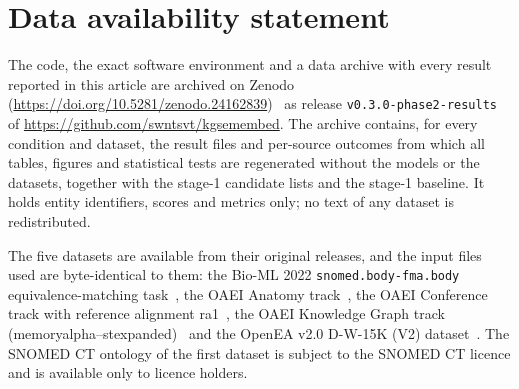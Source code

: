 \section*{Data availability statement}

The code, the exact software environment and a data archive with every
result reported in this article are archived on Zenodo
(\url{https://doi.org/10.5281/zenodo.24162839})~\cite{kgsemembed2026zenodo}
as release \texttt{v0.3.0-phase2-results} of
\url{https://github.com/swntsvt/kgsemembed}. The archive contains, for every
condition and dataset, the result files and per-source outcomes from which
all tables, figures and statistical tests are regenerated without the models
or the datasets, together with the stage-1 candidate lists and the stage-1
baseline. It holds entity identifiers, scores and metrics only; no text of
any dataset is redistributed.

The five datasets are available from their original releases, and the
input files used are byte-identical to them: the Bio-ML 2022
\texttt{snomed.body-fma.body} equivalence-matching task~\cite{he2022bioml},
the OAEI Anatomy track~\cite{bodenreider2005mice,oaei2024anatomy}, the OAEI
Conference track with reference alignment ra1~\cite{zamazal2017ontofarm,oaei2024conference},
the OAEI Knowledge Graph track (memoryalpha--stexpanded)~\cite{hertling2020kgtrack,oaei2023kg}
and the OpenEA v2.0 D-W-15K (V2) dataset~\cite{sun2020openea,openea2020dataset}.
The SNOMED CT ontology of the first dataset is subject to the SNOMED CT
licence and is available only to licence holders.
